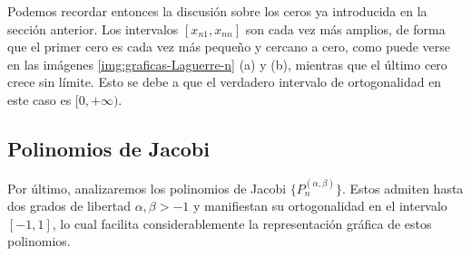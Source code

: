Podemos recordar entonces la discusión sobre los ceros ya introducida en la sección anterior. Los intervalos $[x_{n1}, x_{nn}]$ son cada vez más amplios, de forma que el primer cero es cada vez más pequeño y cercano a cero, como puede verse en las imágenes \ref{img:graficas-Laguerre-n} (a) y (b), mientras que el último cero crece sin límite. Esto se debe a que el verdadero intervalo de ortogonalidad en este caso es $[0,+\infty)$.

\subsection{Polinomios de Jacobi}
\label{subsection:jacobi}

Por último, analizaremos los polinomios de Jacobi $\{P_n^{(\alpha,\beta)}\}$. Estos admiten hasta dos grados de libertad $\alpha,\beta > -1$ y manifiestan su ortogonalidad en el intervalo $[-1,1]$, lo cual facilita considerablemente la representación gráfica de estos polinomios. 

